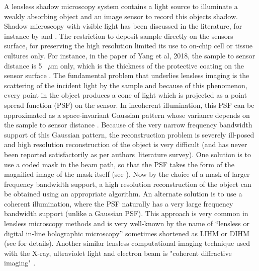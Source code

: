 \documentclass[journal]{IEEEtran}
\begin{document}
A lensless shadow microscopy system contains a light source to illuminate a weakly absorbing object and an image sensor to record this object\textquotesingle s shadow. Shadow microscopy with visible light has been discussed in the literature, for instance by \cite{yang2018resolution,fang2017chip,ozcan2016lensless} and \cite{wu2012optical}. The restriction to deposit sample directly on the sensor\textquotesingle s surface, for preserving the high resolution limited its use to on-chip cell or tissue cultures only. For instance, in the paper of Yang et al, 2018, the sample to sensor distance is 5 \ $\mu$m only, which is the thickness of the protective coating on the sensor surface \cite{yang2018resolution}. The fundamental problem that underlies lensless imaging is the scattering of the incident light by the sample and because of this phenomenon, every point in the object produces a cone of light which is projected as a point spread function (PSF) on the sensor. In incoherent illumination, this PSF can be approximated as a space-invariant Gaussian pattern whose variance depends on the sample to sensor distance \cite{muhammad2012sampling}. Because of the very narrow frequency bandwidth support of this Gaussian pattern, the reconstruction problem is severely ill-posed \cite{bertero2020introduction} and high resolution reconstruction of the object is very difficult (and has never been reported satisfactorily as per authors\textquotesingle \ literature survey). One solution is to use a coded mask in the beam path, so that the PSF takes the form of the magnified image of the mask itself (see \cite{wu2020single,cieslak2016coded,antipa2018diffusercam}). Now by the choice of a mask of larger frequency bandwidth support, a high resolution reconstruction of the object can be obtained using an appropriate algorithm. An alternate solution is to use a coherent illumination, where the PSF naturally has a very large frequency bandwidth support (unlike a Gaussian PSF). This approach is very common in lensless microscopy methods and is very well-known by the name of “lensless or digital in-line holographic microscopy” sometimes shortened as LIHM or DIHM (see \cite{ozcan2016lensless,kumar2020compressive,Kumar_2021,Kumar_2020} for details). Another similar lensless computational imaging technique used with the X-ray, ultraviolet light and electron beam is "coherent diffractive imaging" \cite{miao2011coherent,zurch2014real,clark2012high,yang2013coherent}.
\end{document}
